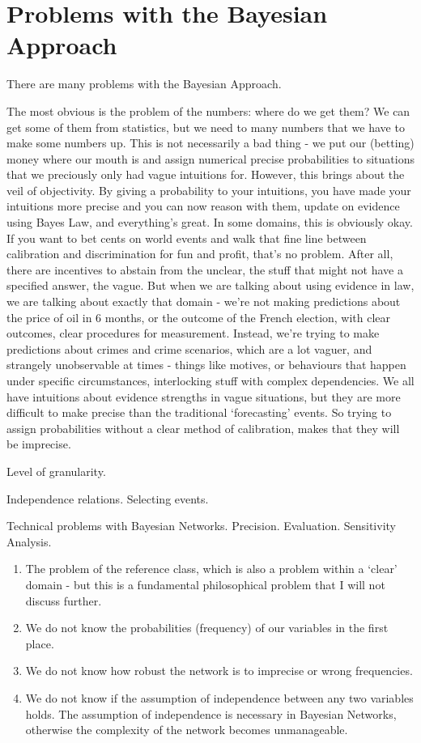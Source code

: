 \section{Problems with the Bayesian Approach}
There are many problems with the Bayesian Approach.

The most obvious is the problem of the numbers: where do we get them? We can get some of them from statistics, but we need to many numbers that we have to make some numbers up. This is not necessarily a bad thing - we put our (betting) money where our mouth is and assign numerical precise probabilities to situations that we preciously only had vague intuitions for. However, this brings about the veil of objectivity. By giving a probability to your intuitions, you have made your intuitions more precise and you can now reason with them, update on evidence using Bayes Law, and everything's great. In some domains, this is obviously okay. If you want to bet cents on world events and walk that fine line between calibration and discrimination for fun and profit, that's no problem.  After all, there are incentives to abstain from the unclear, the stuff that might not have a specified answer, the vague. But when we are talking about using evidence in law, we are talking about exactly that domain - we're not making predictions about the price of oil in 6 months, or the outcome of the French election, with clear outcomes, clear procedures for measurement. Instead, we're trying to make predictions about crimes and crime scenarios, which are a lot vaguer, and strangely unobservable at times - things like motives, or behaviours that happen under specific circumstances, interlocking stuff with complex dependencies. We all have intuitions about evidence strengths in vague situations, but they are more difficult to make precise than the traditional `forecasting' events. So trying to assign probabilities without a clear method of calibration, makes that they will be imprecise.

Level of granularity.

Independence relations. Selecting events.

Technical problems with Bayesian Networks. Precision. Evaluation. Sensitivity Analysis.

\begin{enumerate}
\item The problem of the reference class, which is also a problem within a `clear' domain - but this is a fundamental philosophical problem that I will not discuss further.
\item We do not know the probabilities (frequency) of our variables in the first place.
\item We do not know how robust the network is to imprecise or wrong frequencies.
\item We do not know if the assumption of independence between any two variables holds. The assumption of independence is necessary in Bayesian Networks, otherwise the complexity of the network becomes unmanageable.
\end{enumerate}



 



